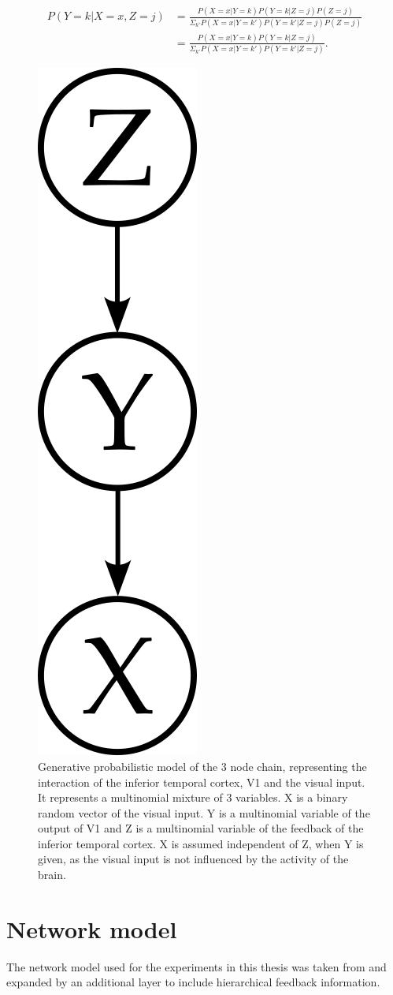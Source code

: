 \begin{equation}
\label{eqn:pYvorausgesetztXUndZ}
\begin{split}
P(Y = k|X = x, Z = j) &= \frac{P(X=x|Y=k)P(Y = k|Z = j)P(Z = j)}{\Sigma_{k'}P(X=x|Y=k')P(Y=k'|Z=j)P(Z=j)}\\
&= \frac{P(X=x|Y=k)P(Y = k|Z = j)}{\Sigma_{k'}P(X=x|Y=k')P(Y=k'|Z=j)}.
\end{split}
\end{equation}

\begin{figure}
  \centering
  \label{fig:generativeModel}
  \includegraphics[width=0.075\linewidth]{figures/generativeModel.png}
  \caption{Generative probabilistic model of the 3 node chain, representing the interaction of the inferior temporal cortex, V1 and the visual input. It represents a multinomial mixture of 3 variables. X is a binary random vector of the visual input. Y is a multinomial variable of the output of V1 and Z is a multinomial variable of the feedback of the inferior temporal cortex. X is assumed independent of Z, when Y is given, as the visual input is not influenced by the activity of the brain.}
\end{figure}

\section{Network model}

The network model used for the experiments in this thesis was taken from \citet{nessler} and expanded by an additional layer to include hierarchical feedback information.

